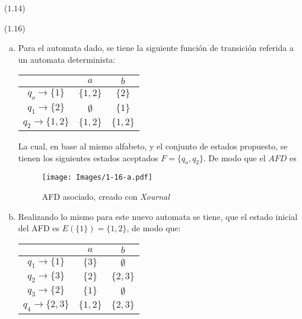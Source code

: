 \begin{mdframed}[style = warning]
	\begin{problem}
		($1.14$) 	 
	\end{problem}
\end{mdframed}











\begin{mdframed}[style = warning]
	\begin{problem}
		($1.16$) 
		\begin{enumerate}[a)]
			\item Para el automata dado, se tiene la siguiente función de transición referida a un automata determinista:
			\begin{table}[H]
				\centering
				\begin{tabular}{c|cc}
					 & $a$ & $b$ \\
					\hline
					$q_o \to \{ 1 \}$ & $\{ 1,2 \}$ & $\{ 2 \}$ \\
					$q_1 \to \{ 2 \}$ & $\emptyset$ & $\{ 1 \}$ \\
					$q_2 \to \{ 1,2 \}$ & $\{ 1,2 \}$ & $\{ 1,2 \}$
				\end{tabular}
			\end{table}
			La cual, en base al mismo alfabeto, y el conjunto de estados propuesto, se tienen los siguientes estados aceptados $F = \{ q_o ,q_2 \}$. De modo que el $AFD$ es
				\begin{figure}[H]
					\centering
					\texttt{[image: Images/1-16-a.pdf]}
					\caption{AFD asociado, creado con \textit{Xournal}}
					\label{16-a}
				\end{figure}
			\item Realizando lo mismo para este nuevo automata se tiene, que el estado inicial del AFD es $E(\{ 1 \}) = \{ 1,2 \}$, de modo que:
				\begin{table}[H]
					\centering
					\begin{tabular}{c|cc}
						 & $a$ & $b$ \\
						\hline
						$q_1 \to \{ 1 \}$ & $\{ 3 \}$ & $\emptyset$ \\
						$q_2 \to \{ 3 \}$ & $\{ 2 \}$ & $\{ 2,3 \}$ \\
						$q_3 \to \{ 2 \}$ & $\{ 1 \}$ & $\emptyset$ \\
						$q_4 \to \{ 2,3 \}$ & $\{ 1,2 \}$ & $\{ 2,3 \}$ \\

\end{tabular}
\end{table}
\end{enumerate}
\end{problem}
\end{mdframed}
